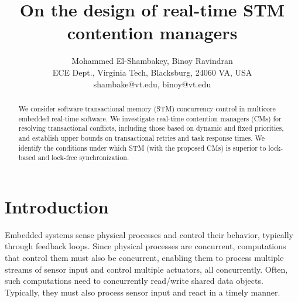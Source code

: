 \documentclass[a4paper,english]{article}
\begin{document}
\title{On the design of real-time STM contention managers%
}


\author{Mohammed El-Shambakey, Binoy Ravindran\\
ECE Dept., Virginia Tech, Blacksburg, 24060 VA, USA\\
shambake@vt.edu, binoy@vt.edu}


\date{}

\maketitle

\begin{abstract}
We consider software transactional memory (STM) concurrency control in multicore embedded real-time software. We investigate real-time contention managers (CMs) for resolving transactional conflicts, including those based on dynamic and fixed priorities, and establish upper bounds on transactional retries and task response times. We identify the conditions under which STM (with the proposed CMs) is superior to lock-based and lock-free synchronization.

\end{abstract}

\section{Introduction}
\label{sec:intro}

Embedded systems sense physical processes and control their behavior, typically through feedback loops. Since physical processes are concurrent, computations that control them must also be concurrent, enabling them to process multiple streams of sensor input and control multiple actuators, all concurrently. Often, such computations need to concurrently read/write shared data objects. Typically, they must also process sensor input and react in a timely manner. 
\end{document}
